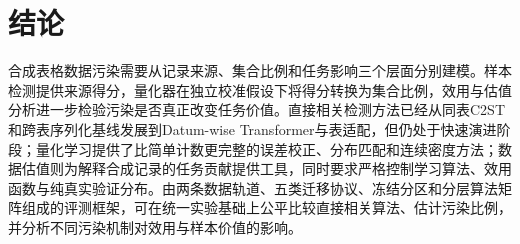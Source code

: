 \documentclass[
  chinese,
  12pt,
  a4paper,
  chinese,
  UTF8]{ctexart}
\begin{document}
\section{结论}\label{ux7ed3ux8bba}

合成表格数据污染需要从记录来源、集合比例和任务影响三个层面分别建模。样本检测提供来源得分，量化器在独立校准假设下将得分转换为集合比例，效用与估值分析进一步检验污染是否真正改变任务价值。直接相关检测方法已经从同表C2ST和跨表序列化基线发展到Datum-wise
Transformer与表适配，但仍处于快速演进阶段；量化学习提供了比简单计数更完整的误差校正、分布匹配和连续密度方法；数据估值则为解释合成记录的任务贡献提供工具，同时要求严格控制学习算法、效用函数与纯真实验证分布。由两条数据轨道、五类迁移协议、冻结分区和分层算法矩阵组成的评测框架，可在统一实验基础上公平比较直接相关算法、估计污染比例，并分析不同污染机制对效用与样本价值的影响。

\printbibliography[title=参考文献]
\end{document}
